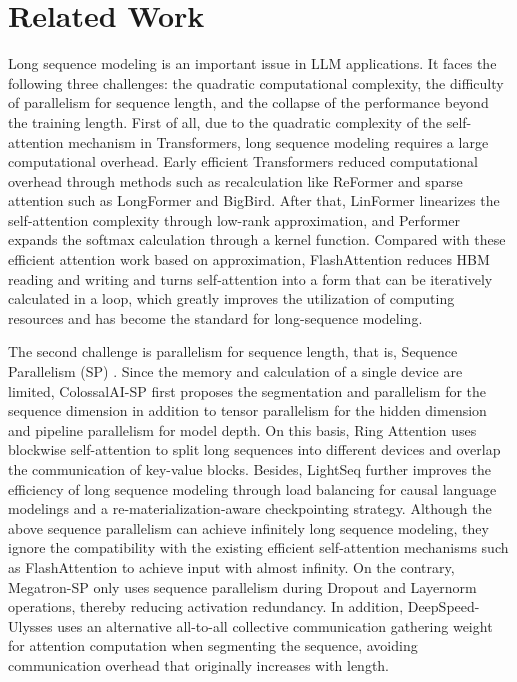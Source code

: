 \section{Related Work}

Long sequence modeling is an important issue in LLM applications. It faces the following three challenges: the quadratic computational complexity, the difficulty of parallelism for sequence length, and the collapse of the performance beyond the training length. First of all, due to the quadratic complexity of the self-attention mechanism in Transformers, long sequence modeling requires a large computational overhead. Early efficient Transformers reduced computational overhead through methods such as recalculation like ReFormer\citep{DBLP:conf/iclr/KitaevKL20} and sparse attention such as LongFormer\cite{DBLP:journals/corr/abs-2004-05150} and BigBird\citep{DBLP:conf/nips/ZaheerGDAAOPRWY20}. After that, LinFormer\citep{DBLP:journals/corr/abs-2006-04768} linearizes the self-attention complexity through low-rank approximation, and Performer\citep{DBLP:conf/iclr/ChoromanskiLDSG21} expands the softmax calculation through a kernel function. Compared with these efficient attention work based on approximation, FlashAttention\citep{DBLP:conf/nips/DaoFERR22,DBLP:journals/corr/abs-2307-08691} reduces HBM reading and writing and turns self-attention into a form that can be iteratively calculated in a loop, which greatly improves the utilization of computing resources and has become the standard for long-sequence modeling.

The second challenge is parallelism for sequence length, that is, Sequence Parallelism (SP) \citep{DBLP:conf/acl/LiXBL023}. Since the memory and calculation of a single device are limited, ColossalAI-SP \citep{DBLP:conf/acl/LiXBL023} first proposes the segmentation and parallelism for the sequence dimension in addition to tensor parallelism for the hidden dimension and pipeline parallelism for model depth. On this basis, Ring Attention\citep{DBLP:journals/corr/abs-2310-01889} uses blockwise self-attention to split long sequences into different devices and overlap the communication of key-value blocks. Besides, LightSeq\citep{DBLP:journals/corr/abs-2310-03294} further improves the efficiency of long sequence modeling through load balancing for causal language modelings and a re-materialization-aware checkpointing strategy. Although the above sequence parallelism can achieve infinitely long sequence modeling, they ignore the compatibility with the existing efficient self-attention mechanisms such as FlashAttention\citep{DBLP:conf/nips/DaoFERR22,DBLP:journals/corr/abs-2307-08691} to achieve input with almost infinity. On the contrary, Megatron-SP\citep{DBLP:journals/corr/abs-2205-05198} only uses sequence parallelism during Dropout and Layernorm operations, thereby reducing activation redundancy. In addition, DeepSpeed-Ulysses\citep{DBLP:journals/corr/abs-2309-14509} uses an alternative all-to-all collective communication gathering weight for attention computation when segmenting the sequence, avoiding communication overhead that originally increases with length.

